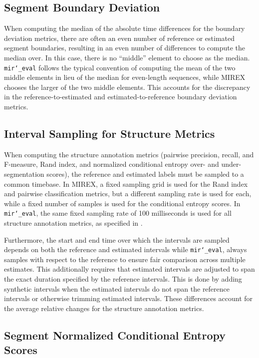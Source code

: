 \documentclass{article}
\def\mireval{\texttt{mir\char`_eval}}
\begin{document}
\subsection{Segment Boundary Deviation}

When computing the median of the absolute time differences for the boundary deviation metrics, there are often an even number of reference or estimated segment boundaries, resulting in an even number of differences to compute the median over.
In this case, there is no ``middle'' element to choose as the median.
\mireval{} follows the typical convention of computing the mean of the two middle elements in lieu of the median for even-length sequences, while MIREX chooses the larger of the two middle elements.
This accounts for the discrepancy in the reference-to-estimated and estimated-to-reference boundary deviation metrics.

\subsection{Interval Sampling for Structure Metrics}

When computing the structure annotation metrics (pairwise precision, recall, and F-measure, Rand index, and normalized conditional entropy over- and under-segmentation scores), the reference and estimated labels must be sampled to a common timebase.
In MIREX, a fixed sampling grid is used for the Rand index and pairwise classification metrics, but a different sampling rate is used for each, while a fixed number of samples is used for the conditional entropy scores.
In \mireval{}, the same fixed sampling rate of 100 milliseconds is used for all structure annotation metrics, as specified in \cite{willis2013mirex}.

Furthermore, the start and end time over which the intervals are sampled depends on both the reference and estimated intervals while \mireval{}, always samples with respect to the reference to ensure fair comparison across multiple estimates.
This additionally requires that estimated intervals are adjusted to span the exact duration specified by the reference intervals.
This is done by adding synthetic intervals when the estimated intervals do not span the reference intervals or otherwise trimming estimated intervals.
These differences account for the average relative changes for the structure annotation metrics.

\subsection{Segment Normalized Conditional Entropy Scores}
\end{document}
